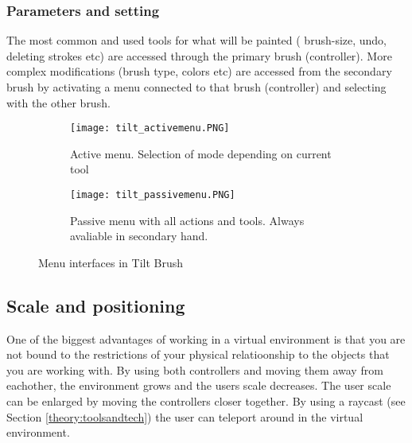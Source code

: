 \subsubsection{Parameters and setting}
The most common and used tools for what will be painted ( brush-size, undo, deleting strokes etc) are accessed through the primary brush (controller). More complex modifications (brush type, colors etc) are accessed from the secondary brush by activating a menu connected to that brush (controller) and selecting with the other brush.
\begin{figure}
\begin{subfigure}{.5\textwidth}
  \centering
  \texttt{[image: tilt\_activemenu.PNG]}
  \caption{Active menu. Selection of mode depending on current tool}
  \label{fig:sfig1:tilt_activemenu}
\end{subfigure}%
\begin{subfigure}{.5\textwidth}
  \centering
  \texttt{[image: tilt\_passivemenu.PNG]}
  \caption{Passive menu with all actions and tools. Always avaliable in secondary hand. }
  \label{fig:sfig2:tilt_activemenu}
\end{subfigure}
\caption{Menu interfaces in Tilt Brush}
\label{fig:fig:tilt_menu}
\end{figure}
\subsection{Scale and positioning}
One of the biggest advantages of working in a virtual environment is that you are not bound to the restrictions of your physical relatioonship to the objects that you are working with. By using both controllers and moving them away from eachother, the environment grows and the users scale decreases. The user scale can be enlarged by moving the controllers closer together.
By using a raycast (see Section \ref{theory:toolsandtech}) the user can teleport around in the virtual environment.
